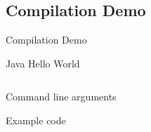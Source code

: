 \documentclass[table,xcolor=table]{IFMG-beamer}
\begin{document}
\subsection{Compilation Demo}
\begin{frame}{Compilation Demo}
  \begin{block}{Java Hello World}
    \inputminted{Java}{code/hello_world.java}
  \end{block}
\end{frame}

\begin{frame}{Command line arguments}
  \begin{block}{Example code}
    \inputminted{Java}{code/CLI.java}
  \end{block}
\end{frame}
\end{document}

